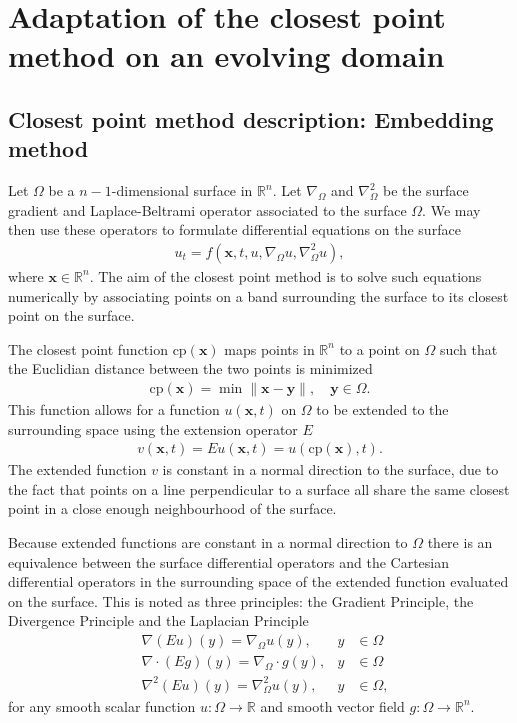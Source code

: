 \documentclass[fleqn,12pt]{siamart1116}
\begin{document}
\section{Adaptation of the closest point method on an evolving domain}

\subsection{Closest point method description: Embedding method}

Let $\Omega$ be a $n-1$-dimensional surface in $\mathbb{R}^{n}$. Let $\nabla_{\Omega}$ and $\nabla^2_{\Omega}$ be the surface gradient and Laplace-Beltrami operator associated to the surface $\Omega$. We may then use these operators to formulate differential equations on the surface
\begin{align}
u_t = f(\mathbf{x}, t, u, \nabla_{\Omega} u, \nabla^2_{\Omega} u),
\end{align}
where $\mathbf{x} \in \mathbb{R}^{n}$. The aim of the closest point method is to solve such equations numerically by associating points on a band surrounding the surface to its closest point on the surface.

The closest point function $\text{cp}(\mathbf{x})$ maps points in $\mathbb{R}^{n}$ to a point on $\Omega$ such that the Euclidian distance between the two points is minimized
\begin{align}
\text{cp}(\mathbf{x}) = \min \| \mathbf{x} - \mathbf{y} \|, \quad \mathbf{y} \in \Omega.
\end{align}
This function allows for a function $u(\mathbf{x}, t)$ on $\Omega$ to be extended to the surrounding space using the extension operator $E$
\begin{align}
v(\mathbf{x}, t) = E u(\mathbf{x}, t) = u(\text{cp}(\mathbf{x}), t).
\end{align}
The extended function $v$ is constant in a normal direction to the surface, due to the fact that points on a line perpendicular to a surface all share the same closest point in a close enough neighbourhood of the surface.

Because extended functions are constant in a normal direction to $\Omega$ there is an equivalence between the surface differential operators and the Cartesian differential operators in the surrounding space of the extended function evaluated on the surface. This is noted as three principles: the Gradient Principle, the Divergence Principle and the Laplacian Principle
\begin{align}
&\nabla (Eu)(y) = \nabla_{\Omega}u(y), & y &\in \Omega\\
&\nabla \cdot (Eg)(y) = \nabla_{\Omega} \cdot g(y), & y &\in \Omega\\
&\nabla^2 (Eu)(y) = \nabla^2_{\Omega}u(y), & y &\in \Omega,
\end{align}
for any smooth scalar function $u: \Omega \to \mathbb{R}$ and smooth vector field $g: \Omega \to \mathbb{R}^n$.
\end{document}
